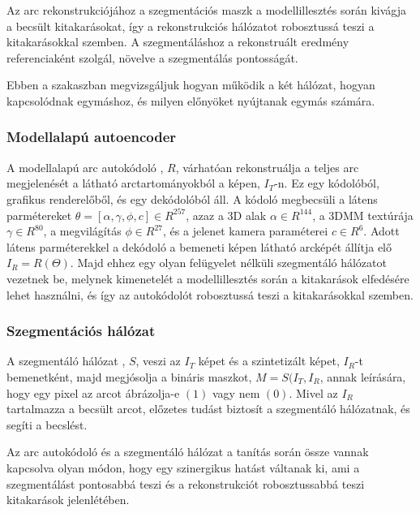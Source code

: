 \documentclass[12pt,a4]{article}
\begin{document}
            Az arc rekonstrukciójához a szegmentációs maszk a modellillesztés során
     	      kivágja a becsült kitakarásokat, így a rekonstrukciós hálózatot robosztussá
     	      teszi a kitakarásokkal szemben. A szegmentáláshoz a rekonstruált eredmény
     	      referenciaként szolgál, növelve a szegmentálás pontosságát.
    
            Ebben a szakaszban megvizsgáljuk hogyan működik a két hálózat,
     	      hogyan kapcsolódnak egymáshoz, és milyen előnyöket nyújtanak
     	      egymás számára.

            \subsubsection{Modellalapú autoencoder}
        
                A modellalapú arc autokódoló \cite{focus}, $R$, várhatóan rekonstruálja a teljes arc
     	          megjelenését a látható arctartományokból a képen, $I_{T}$-n. 
                Ez egy kódolóból, grafikus renderelőből, és egy dekódolóból áll. A kódoló megbecsüli a látens parmétereket $\theta = [\alpha, \gamma, \phi, c] \in R^{257}$, azaz a 3D alak $\alpha \in R^{144}$, a 3DMM textúrája 
                $\gamma ∈ R^{80}$, a megvilágítás $\phi ∈ R^{27}$, és a jelenet kamera paraméterei $c ∈ R^{6}$. Adott látens parméterekkel a dekódoló a bemeneti képen látható arcképét állítja elő $I_{R} = R(\Theta)$. Majd ehhez egy olyan felügyelet nélküli szegmentáló hálózatot vezetnek be, melynek kimenetelét a modellillesztés során a kitakarások elfedésére lehet használni, és így az autokódolót robosztussá teszi a kitakarásokkal szemben.

            \subsubsection{Szegmentációs hálózat}
    
                A szegmentáló hálózat \cite{focus}, $S$, veszi az $I_{T}$ képet és a szintetizált képet, $I_{R}$-t bemenetként, majd megjósolja a bináris maszkot, $M = S(I_{T} , I_{R}$, annak leírására, hogy egy pixel az arcot ábrázolja-e $(1)$ vagy nem $(0)$. Mivel az $I_R$ tartalmazza a becsült arcot, előzetes tudást biztosít a szegmentáló hálózatnak, és segíti a becslést.
     	
     	          Az arc autokódoló és a szegmentáló hálózat a tanítás során össze 
                vannak kapcsolva olyan módon, hogy egy szinergikus hatást váltanak ki, ami a szegmentálást pontosabbá teszi és a rekonstrukciót robosztussabbá teszi kitakarások jelenlétében.
\end{document}

